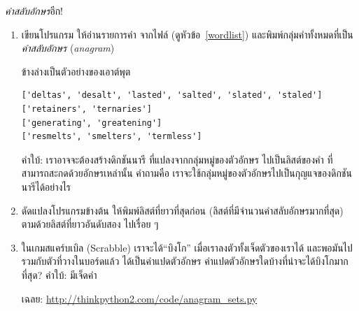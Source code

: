 \begin{exercise}
\label{anagrams}

\textit{คำสลับอักษร}อีก!

\begin{enumerate}


\item เขียนโปรแกรม ให้อ่านรายการคำ จากไฟล์ (ดูหัวข้อ~\ref{wordlist})
และพิมพ์กลุ่มคำทั้งหมดที่เป็น\textit{คำสลับอักษร} (\textit{anagram})


ข้างล่างเป็นตัวอย่างของเอาต์พุต

\begin{verbatim}
['deltas', 'desalt', 'lasted', 'salted', 'slated', 'staled']
['retainers', 'ternaries']
['generating', 'greatening']
['resmelts', 'smelters', 'termless']
\end{verbatim}
%
%
คำใบ้: เราอาจจะต้องสร้างดิกชันนารี
ที่แปลงจากกลุ่มหมู่ของตัวอักษร
ไปเป็นลิสต์ของคำ ที่สามารถสะกดด้วยอักษรเหล่านั้น
คำถามคือ เราจะใช้กลุ่มหมู่ของตัวอักษรไปเป็นกุญแจของดิกชันนารีได้อย่างไร


\item ดัดแปลงโปรแกรมข้างต้น ให้พิมพ์ลิสต์ที่ยาวที่สุดก่อน (ลิสต์ที่มีจำนวนคำสลับอักษรมากที่สุด) ตามด้วยลิสต์ที่ยาวอันดับสอง ไปเรื่อย ๆ


\item ในเกมสแคร์บเบิล (Scrabble) 
เราจะได้``บิงโก'' เมื่อเราลงตัวทั้งเจ็ดตัวของเราได้ และพอมันไปรวมกับตัวที่วางในบอร์ดแล้ว ได้เป็นคำแปดตัวอักษร
คำแปดตัวอักษรใดบ้างที่น่าจะได้บิงโกมากที่สุด?
คำใบ้: มีเจ็ดคำ



เฉลย: \url{http://thinkpython2.com/code/anagram_sets.py}


\end{enumerate}
\end{exercise}
\vspace{0.5cm}


